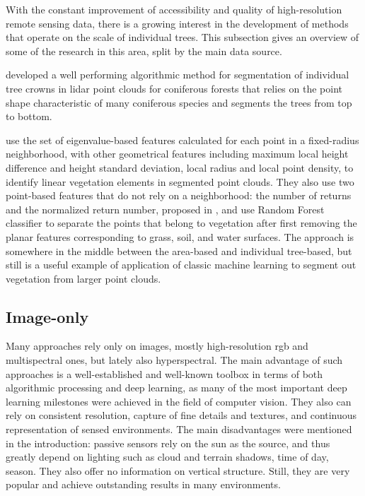 With the constant improvement of accessibility and quality of high-resolution remote sensing data, there is a growing interest in the development of methods that operate on the scale of individual trees.
This subsection gives an overview of some of the research in this area, split by the main data source.

\citet{liNewMethodSegmenting2012} developed a well performing algorithmic method for segmentation of individual tree crowns in \gls{lidar} point clouds for coniferous forests that relies on the point shape characteristic of many coniferous species and segments the trees from top to bottom.

\citet{lucasIdentificationLinearVegetation2019} use the set of eigenvalue-based features calculated for each point in a fixed-radius neighborhood, with other geometrical features including maximum local height difference and height standard deviation, local radius and local point density, to identify linear vegetation elements in segmented point clouds.
They also use two point-based features that do not rely on a neighborhood: the number of returns and the normalized return number, proposed in \citet{guoRelevanceAirborneLidar2011}, and use Random Forest classifier to separate the points that belong to vegetation after first removing the planar features corresponding to grass, soil, and water surfaces.
The approach is somewhere in the middle between the area-based and individual tree-based, but still is a useful example of application of classic machine learning to segment out vegetation from larger point clouds.

\subsection{Image-only}

Many approaches rely only on images, mostly high-resolution \gls{rgb} and multispectral ones, but lately also hyperspectral.
The main advantage of such approaches is a well-established and well-known toolbox in terms of both algorithmic processing and deep learning, as many of the most important deep learning milestones were achieved in the field of computer vision.
They also can rely on consistent resolution, capture of fine details and textures, and continuous representation of sensed environments.
The main disadvantages were mentioned in the introduction: passive sensors rely on the sun as the source, and thus greatly depend on lighting such as cloud and terrain shadows, time of day, season.
They also offer no information on vertical structure.
Still, they are very popular and achieve outstanding results in many environments.

